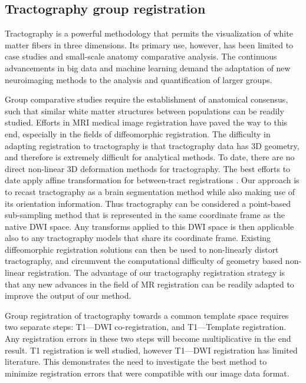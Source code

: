 \subsection{Tractography group registration}
Tractography is a powerful methodology that permits the visualization of white matter fibers in three dimensions. Its primary use, however, has been limited to case studies and small-scale anatomy comparative analysis. The continuous advancements in big data and machine learning demand the adaptation of new neuroimaging methods to the analysis and quantification of larger groups.

Group comparative studies require the establishment of anatomical consensus, such that similar white matter structures between populations can be readily studied. Efforts in MRI medical image registration have paved the way to this end, especially in the fields of diffeomorphic registration. The difficulty in adapting registration to tractography is that tractography data has 3D geometry, and therefore is extremely difficult for analytical methods. To date, there are no direct non-linear 3D deformation methods for tractography. The best efforts to date apply affine transformation for between-tract registrations \cite{Garyfallidis2015}. Our approach is to recast tractography as a brain segmentation method while also making use of its orientation information. Thus tractography can be considered a point-based sub-sampling method that is represented in the same coordinate frame as the native DWI space. Any transforms applied to this DWI space is then applicable also to any tractography models that share its coordinate frame. Existing diffeomorphic registration solutions can then be used to non-linearly distort tractography, and circumvent the computational difficulty of geometry based non-linear registration. The advantage of our tractography registration strategy is that any new advances in the field of MR registration can be readily adapted to improve the output of our method. 

Group registration of tractography towards a common template space requires two separate steps: T1---DWI co-registration, and T1---Template registration. Any registration errors in these two steps will become multiplicative in the end result. T1 registration is well studied, however T1---DWI registration has limited literature. This demonstrates the need to investigate the best method to minimize registration errors that were compatible with our image data format.

